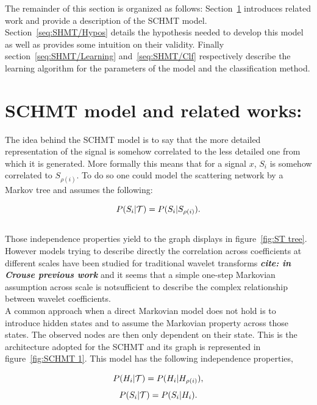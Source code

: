 \documentclass[a4paper,11pt]{report}
\begin{document}
{  The remainder of this section is organized as follows: Section~\ref{seq:SHMT/Rel work} introduces related work and provide a description of the SCHMT model. Section~\ref{seq:SHMT/Hypos} details the hypothesis needed to develop this model as well as provides some intuition on their validity. Finally section~\ref{seq:SHMT/Learning} and~\ref{seq:SHMT/Clf} respectively describe the learning algorithm for the parameters of the model and the classification method.

  
  \section{SCHMT model and related works:}
    \label{seq:SHMT/Rel work}
      
    The idea behind the SCHMT model is to say that the more detailed representation of the signal is somehow correlated to the less detailed one from which it is generated. More formally this means that for a signal $x$, $S_{i}$ is somehow correlated to $S_{\rho(i)}$. To do so one could model the scattering network by a Markov tree and assumes the following:
    
    \begin{equation}
      P(S_{i} |\mathcal{T}) = P(S_{i} | S_{\rho(i)}).
      \label{eq:SMT - false hypo}
    \end{equation}\\

    Those independence properties yield to the graph displays in figure~\ref{fig:ST tree}. However models trying to describe directly the correlation across coefficients at different scales have been studied for traditional wavelet transforms \textbf{\textit{cite: in Crouse previous work}} and it seems that a simple one-step Markovian assumption across scale is notsufficient to describe the complex relationship between wavelet coefficients.\\
    
    A common approach when a direct Markovian model does not hold is to introduce hidden states and to assume the Markovian property across those states. The observed nodes are then only dependent on their state. This is the architecture adopted for the SCHMT and its graph is represented in figure~\ref{fig:SCHMT 1}. This model has the following independence properties,
    
    \begin{equation}
      P(H_{i} |\mathcal{T}) = P(H_{i} | H_{\rho(i)}),
      \label{eq:SCHMT - hypo 1}
    \end{equation}    
    \begin{equation}
      P(S_{i} |\mathcal{T}) = P(S_{i} | H_{i}).
      \label{eq:SCHMT - hypo 2}
    \end{equation} \\
    
}
\end{document}
